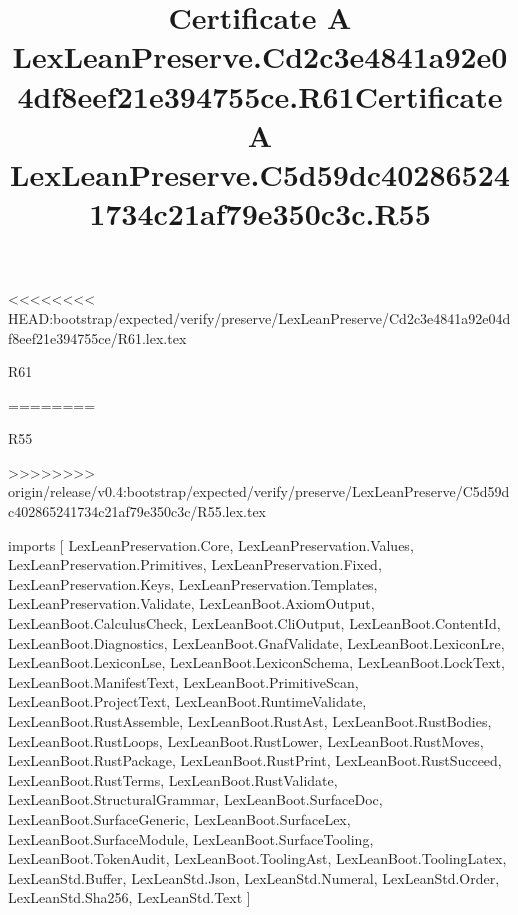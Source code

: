 <<<<<<<< HEAD:bootstrap/expected/verify/preserve/LexLeanPreserve/Cd2c3e4841a92e04df8eef21e394755ce/R61.lex.tex
\begin{lexlean}{R61}
\title{Certificate A LexLeanPreserve.Cd2c3e4841a92e04df8eef21e394755ce.R61}
========
\begin{lexlean}{R55}
\title{Certificate A LexLeanPreserve.C5d59dc402865241734c21af79e350c3c.R55}
>>>>>>>> origin/release/v0.4:bootstrap/expected/verify/preserve/LexLeanPreserve/C5d59dc402865241734c21af79e350c3c/R55.lex.tex
\begin{coremodule}
imports [
  LexLeanPreservation.Core,
  LexLeanPreservation.Values,
  LexLeanPreservation.Primitives,
  LexLeanPreservation.Fixed,
  LexLeanPreservation.Keys,
  LexLeanPreservation.Templates,
  LexLeanPreservation.Validate,
  LexLeanBoot.AxiomOutput,
  LexLeanBoot.CalculusCheck,
  LexLeanBoot.CliOutput,
  LexLeanBoot.ContentId,
  LexLeanBoot.Diagnostics,
  LexLeanBoot.GnafValidate,
  LexLeanBoot.LexiconLre,
  LexLeanBoot.LexiconLse,
  LexLeanBoot.LexiconSchema,
  LexLeanBoot.LockText,
  LexLeanBoot.ManifestText,
  LexLeanBoot.PrimitiveScan,
  LexLeanBoot.ProjectText,
  LexLeanBoot.RuntimeValidate,
  LexLeanBoot.RustAssemble,
  LexLeanBoot.RustAst,
  LexLeanBoot.RustBodies,
  LexLeanBoot.RustLoops,
  LexLeanBoot.RustLower,
  LexLeanBoot.RustMoves,
  LexLeanBoot.RustPackage,
  LexLeanBoot.RustPrint,
  LexLeanBoot.RustSucceed,
  LexLeanBoot.RustTerms,
  LexLeanBoot.RustValidate,
  LexLeanBoot.StructuralGrammar,
  LexLeanBoot.SurfaceDoc,
  LexLeanBoot.SurfaceGeneric,
  LexLeanBoot.SurfaceLex,
  LexLeanBoot.SurfaceModule,
  LexLeanBoot.SurfaceTooling,
  LexLeanBoot.TokenAudit,
  LexLeanBoot.ToolingAst,
  LexLeanBoot.ToolingLatex,
  LexLeanStd.Buffer,
  LexLeanStd.Json,
  LexLeanStd.Numeral,
  LexLeanStd.Order,
  LexLeanStd.Sha256,
  LexLeanStd.Text
]


\end{coremodule}
\end{lexlean}
\end{lexlean}
